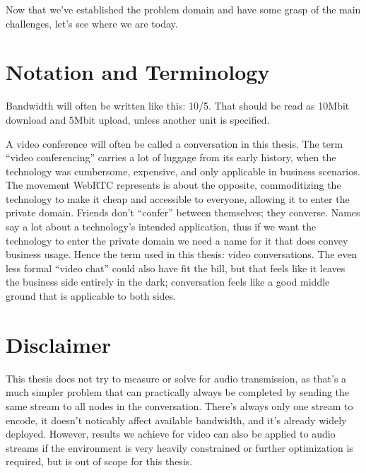Now that we've established the problem domain and have some grasp of the main challenges, let's see where we are today.


\section{Notation and Terminology}

Bandwidth will often be written like this: 10/5. That should be read as 10Mbit download and 5Mbit upload, unless another unit is specified.

A video conference will often be called a conversation in this thesis. The term ``video conferencing'' carries a lot of luggage from its early history, when the technology was cumbersome, expensive, and only applicable in business scenarios. The movement WebRTC represents is about the opposite, commoditizing the technology to make it cheap and accessible to everyone, allowing it to enter the private domain. Friends don't ``confer'' between themselves; they converse. Names say a lot about a technology's intended application, thus if we want the technology to enter the private domain we need a name for it that does convey business usage. Hence the term used in this thesis: video conversations. The even less formal ``video chat'' could also have fit the bill, but that feels like it leaves the business side entirely in the dark; conversation feels like a good middle ground that is applicable to both sides.


\section{Disclaimer}

This thesis does not try to measure or solve for audio transmission, as that's a much simpler problem that can practically always be completed by sending the same stream to all nodes in the conversation. There's always only one stream to encode, it doesn't noticably affect available bandwidth, and it's already widely deployed. However, results we achieve for video can also be applied to audio streams if the environment is very heavily constrained or further optimization is required, but is out of scope for this thesis.
